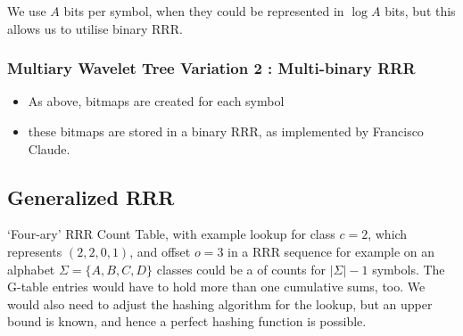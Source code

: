 We use $A$ bits per symbol, when they could be represented in $\log A$ bits, but
this allows us to utilise binary RRR.

\subsubsection{Multiary Wavelet Tree Variation 2 : Multi-binary RRR}
\begin{itemize}
\item
  As above, bitmaps are created for each symbol
\item
  these bitmaps are stored in a binary RRR, as implemented by
  Francisco Claude.
\end{itemize}

\subsection{Generalized RRR}
	{`Four-ary' RRR Count Table, with example lookup for class $c = 2$, 
	which represents $(2, 2, 0, 1)$, and offset $o = 3$ in a RRR
	sequence}
	for 
	example on an alphabet $\Sigma = \{ A, B, C, D \}$ classes could be a  of counts for 
	$|\Sigma| - 1$ symbols. The G-table entries would have to hold more than one 
	cumulative sums, too. We would also need to adjust the hashing algorithm for the 
	lookup, but an upper bound is known, and hence a perfect hashing function is 
	possible.